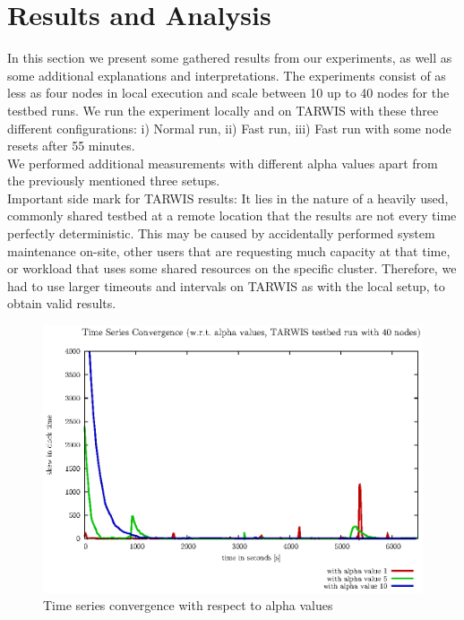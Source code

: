 \documentclass{llncs}
\begin{document}
\section{Results and Analysis}
In this section we present some gathered results from our experiments, as well as some additional explanations and interpretations. The experiments consist of as less as four nodes in local execution and scale between 10 up to 40 nodes for the testbed runs. We run the experiment locally and on TARWIS with these three different configurations: i) Normal run, ii) Fast run, iii) Fast run with some node resets after 55 minutes.\\
We performed additional measurements with different alpha values apart from the previously mentioned three setups.\\
Important side mark for TARWIS results: It lies in the nature of a heavily used, commonly shared testbed at a remote location that the results are not every time perfectly deterministic. This may be caused by accidentally performed system maintenance on-site, other users that are requesting much capacity at that time, or workload that uses some shared resources on the specific cluster. Therefore, we had to use larger timeouts and intervals on TARWIS as with the local setup, to obtain valid results.
\begin{figure}[H]
	\centering
	\includegraphics[scale=0.6]{images/FIG_01.eps}
	\caption{Time series convergence with respect to alpha values}
	\label{fig:alpha}
\end{figure}
\end{document}
